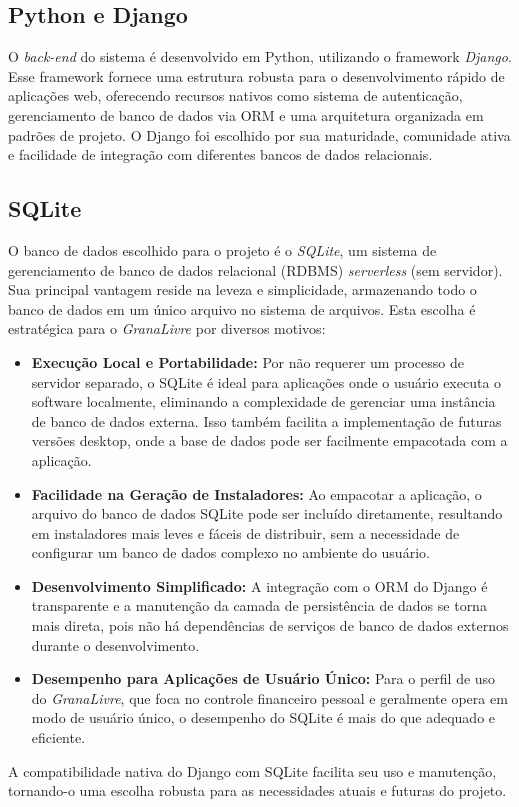 \subsection{Python e Django}
O \textit{back-end} do sistema é desenvolvido em Python, utilizando o framework \textit{Django}. Esse framework fornece uma estrutura robusta para o desenvolvimento rápido de aplicações web, oferecendo recursos nativos como sistema de autenticação, gerenciamento de banco de dados via ORM e uma arquitetura organizada em padrões de projeto.  
O Django foi escolhido por sua maturidade, comunidade ativa e facilidade de integração com diferentes bancos de dados relacionais.

\subsection{SQLite}
O banco de dados escolhido para o projeto é o \textit{SQLite}, um sistema de gerenciamento de banco de dados relacional (RDBMS) \textit{serverless} (sem servidor). Sua principal vantagem reside na leveza e simplicidade, armazenando todo o banco de dados em um único arquivo no sistema de arquivos. Esta escolha é estratégica para o \textit{GranaLivre} por diversos motivos:
\begin{itemize}
    \item \textbf{Execução Local e Portabilidade:} Por não requerer um processo de servidor separado, o SQLite é ideal para aplicações onde o usuário executa o software localmente, eliminando a complexidade de gerenciar uma instância de banco de dados externa. Isso também facilita a implementação de futuras versões desktop, onde a base de dados pode ser facilmente empacotada com a aplicação.
    \item \textbf{Facilidade na Geração de Instaladores:} Ao empacotar a aplicação, o arquivo do banco de dados SQLite pode ser incluído diretamente, resultando em instaladores mais leves e fáceis de distribuir, sem a necessidade de configurar um banco de dados complexo no ambiente do usuário.
    \item \textbf{Desenvolvimento Simplificado:} A integração com o ORM do Django é transparente e a manutenção da camada de persistência de dados se torna mais direta, pois não há dependências de serviços de banco de dados externos durante o desenvolvimento.
    \item \textbf{Desempenho para Aplicações de Usuário Único:} Para o perfil de uso do \textit{GranaLivre}, que foca no controle financeiro pessoal e geralmente opera em modo de usuário único, o desempenho do SQLite é mais do que adequado e eficiente.
\end{itemize}
A compatibilidade nativa do Django com SQLite facilita seu uso e manutenção, tornando-o uma escolha robusta para as necessidades atuais e futuras do projeto.

